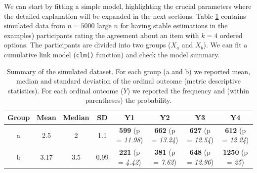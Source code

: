 \documentclass[
  man,floatsintext]{apa6}
\begin{document}
We can start by fitting a simple model, highlighting the crucial parameters where the detailed explanation will be expanded in the next sections. Table \ref{tab:tab-dataset-example-latex} contains simulated data from \(n = 5000\) large \(n\) for having stable estimations in the examples) participants rating the agreement about an item with \(k = 4\) ordered options. The participants are divided into two groups (\(X_a\) and \(X_b\)). We can fit a cumulative link model (\texttt{clm()} function) and check the model summary.

\scriptsize

\normalsize

\scriptsize

\begin{table}
\centering
\caption{\label{tab:tab-dataset-example-latex}Summary of the simulated dataset. For each group (a and b) we reported mean, median and standard deviation of the ordinal outcome (metric descriptive statistics). For each ordinal outcome (\(Y\)) we reported the frequency and (within parentheses) the probability.}
\centering
\begin{tabular}[t]{cccccccc}
\toprule
\textbf{Group} & \textbf{Mean} & \textbf{Median} & \textbf{SD} & \textbf{Y1} & \textbf{Y2} & \textbf{Y3} & \textbf{Y4}\\
\midrule
a & 2.5 & 2 & 1.1 & \textbf{599} (p = \textit{11.98}) & \textbf{662} (p = \textit{13.24}) & \textbf{627} (p = \textit{12.54}) & \textbf{612} (p = \textit{12.24})\\
b & 3.17 & 3.5 & 0.99 & \textbf{221} (p = \textit{4.42}) & \textbf{381} (p = \textit{7.62}) & \textbf{648} (p = \textit{12.96}) & \textbf{1250} (p = \textit{25})\\
\bottomrule
\end{tabular}
\end{table}

\normalsize

\scriptsize

\normalsize

\scriptsize
\end{document}
